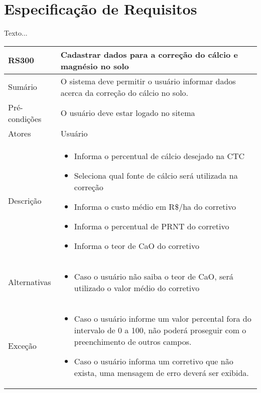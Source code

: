 \section{Especificação de Requisitos}
\label{sec:titSecEspReq}

Texto...

\begin{quadro}[H]
    \begin{tabular}{|p{3cm}|p{11cm}|}
        \hline
        \textbf{RS300} & \textbf{Cadastrar dados para a correção do cálcio e magnésio no solo}                  \\
        \hline
        Sumário        & O sistema deve permitir o usuário informar dados acerca da correção do cálcio no solo. \\
        \hline
        Pré-condições  & O usuário deve estar logado no sitema                                                  \\
        \hline
        Atores         & Usuário                                                                                \\
        \hline
        Descrição      &
        \begin{itemize}
            \item Informa o percentual de cálcio desejado na CTC
            \item Seleciona qual fonte de cálcio será utilizada na correção
            \item Informa o custo médio em R\$/ha do corretivo
            \item Informa o percentual de PRNT do corretivo
            \item Informa o teor de CaO do corretivo
        \end{itemize}                                                                               \\
        \hline
        Alternativas   &
        \begin{itemize}
            \item Caso o usuário não saiba o teor de CaO, será utilizado o valor médio do corretivo
        \end{itemize}                                                                               \\
        \hline
        Exceção        &
        \begin{itemize}
            \item Caso o usuário informe um valor percental fora do intervalo de 0 a 100, não poderá proseguir com o preenchimento de outros campos.
            \item Caso o usuário informa um corretivo que não exista, uma mensagem de erro deverá ser exibida.
        \end{itemize}                                                                               \\
        \hline
    \end{tabular}
\end{quadro}

